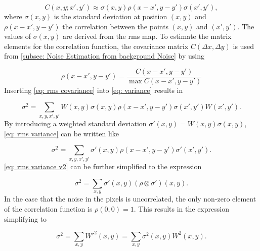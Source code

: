 \begin{equation}\label{eq: rms covariance}
    C(x,y;x',y') \approx \sigma(x,y)\rho(x-x',y-y')\sigma(x',y'),
\end{equation}
where $\sigma(x,y)$ is the standard deviation at position $(x,y)$ and $\rho(x-x',y-y')$ the correlation between the points $(x,y)$ and $(x',y')$. The values of $\sigma(x,y)$ are derived from the \gls{rms} map. To estimate the matrix elements for the correlation function, the covariance matrix $C(\Delta x, \Delta y)$ is used from \autoref{subsec: Noise Estimation from background Noise} by using 

\begin{equation}
    \rho(x-x',y-y')=\frac{C(x-x',y-y')}{\max C(x-x',y-y')}
\end{equation}
Inserting \autoref{eq: rms covariance} into \autoref{eq: variance} results in

\begin{equation}\label{eq: rms variance}
    \sigma^2=\sum_{x,y,x',y'}W(x,y)\sigma(x,y)\rho(x-x',y-y')\sigma(x',y')W(x',y').
\end{equation}
By introducing a weighted standard deviation $\sigma'(x,y)=W(x,y)\sigma(x,y)$, \autoref{eq: rms variance} can be written like

\begin{equation}\label{eq: rms variance v2}
    \sigma^2=\sum_{x,y,x',y'}\sigma'(x,y)\rho(x-x',y-y')\sigma'(x',y').
\end{equation}
\autoref{eq: rms variance v2} can be further simplified to the expression

\begin{equation}\label{eq: variance rms correlated}
    \sigma^2=\sum_{x,y}\sigma'(x,y)(\rho\otimes \sigma')(x,y).
\end{equation}
In the case that the noise in the pixels is uncorrelated, the only non-zero element of the correlation function is $\rho(0,0)=1$. This results in the expression simplifying to

\begin{equation}\label{eq: variance rms uncorrelated}
    \sigma^2=\sum_{x,y}W'^2(x,y) =\sum_{x,y}\sigma^2(x,y)W^2(x,y).
\end{equation}


